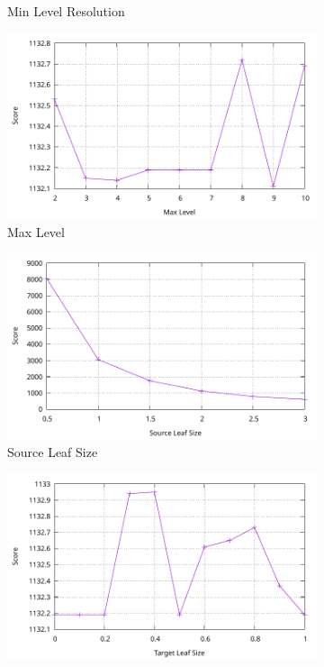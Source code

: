 \begin{figure}[t]
\begin{subfigure}[t]{0.32\textwidth}
        \caption{Min Level Resolution}
    \end{subfigure}
    \begin{subfigure}[t]{0.32\textwidth}
        \centering
        \includegraphics[width=\textwidth]{../02-global-localization/plots/max_level.pdf}
        \caption{Max Level}
    \end{subfigure}
    \begin{subfigure}[t]{0.32\textwidth}
        \centering
        \includegraphics[width=\textwidth]{../02-global-localization/plots/src_leaf_size.pdf}
        \caption{Source Leaf Size}
    \end{subfigure}
    \begin{subfigure}[t]{0.32\textwidth}
        \centering
        \includegraphics[width=\textwidth]{../02-global-localization/plots/tar_leaf_size.pdf}

\end{subfigure}
\end{figure}
